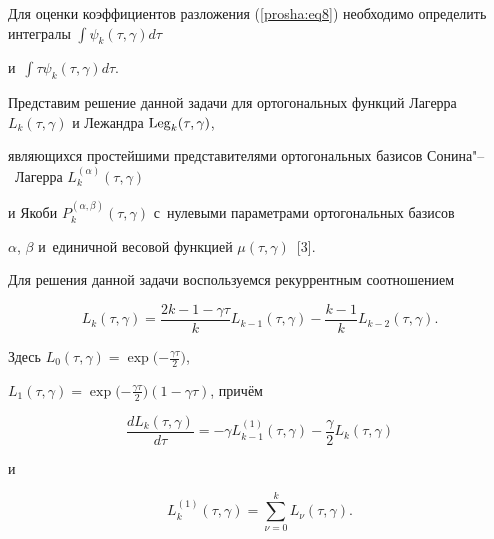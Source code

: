 Для оценки коэффициентов разложения (\ref{prosha:eq8}) необходимо определить интегралы $\displaystyle \int \psi _k  (\tau , \gamma )d\tau $

и~$\displaystyle \int \tau \psi _k  (\tau, \gamma )d\tau $.







Представим решение данной задачи для ортогональных функций Лагерра $L_k  (\tau , \gamma )$ и Лежандра ${\rm Leg}_k  (\tau , \gamma )$,

являющихся простейшими представителями ортогональных базисов Сонина"--~Лагерра $L_k^{ ( \alpha  )}  (\tau, \gamma )$

и Якоби $P_k^{ ( \alpha , \beta )}  (\tau , \gamma )$ с~нулевыми параметрами ортогональных базисов

$\alpha $, $\beta $ и~единичной весовой функцией $\mu  (\tau, \gamma )$~[3].



Для решения данной задачи воспользуемся рекуррентным соотношением

\begin{equation}

\label{prosha:eq9}

L_k  ( \tau , \gamma  )=\frac{  2k-1-\gamma \tau }{k}L_{k-1}  (\tau , \gamma )-\frac{k-1}{k}L_{k-2} ( \tau , \gamma  ).

\end{equation}

Здесь  $L_0  ( \tau , \gamma  )=\exp\bigl({-\frac{\gamma \tau }{2}}\bigr)$,

$L_1 ( \tau , \gamma  )=\exp\bigl({-\frac{\gamma \tau }{2}}\bigr) ( 1-\gamma \tau  )$, причём

\begin{equation}

\label{prosha:eq10}

\frac{dL_k  (\tau , \gamma  )}{d\tau }=-\gamma L_{k-1}^{ (1)}  ( \tau, \gamma  )-\frac{\gamma }{2}L_k  (\tau, \gamma )

\end{equation}

и

\begin{equation}

\label{prosha:eq11}

L_k^{ (1)}  (\tau , \gamma)=\sum\limits_{\nu =0}^k L_\nu  (\tau, \gamma ) .

\end{equation}

